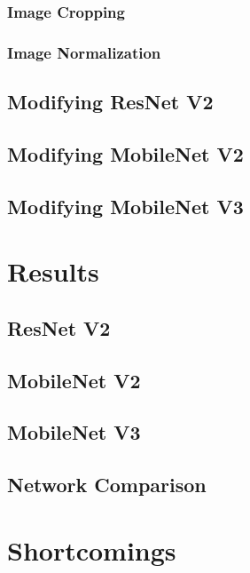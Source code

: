 \documentclass[conference]{IEEEtran}
\begin{document}
\subsubsection{Image Cropping}


\subsubsection{Image Normalization}

\subsection{Modifying ResNet V2}


\subsection{Modifying MobileNet V2}


\subsection{Modifying MobileNet V3}




\section{Results} %


\subsection{ResNet V2}


\subsection{MobileNet V2}


\subsection{MobileNet V3}


\subsection{Network Comparison}




\section{Shortcomings} %
\end{document}
